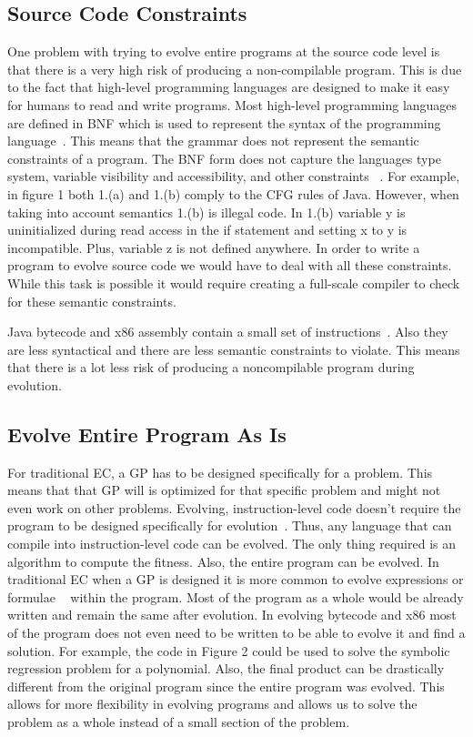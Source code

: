 \documentclass{sig-alternate}
\begin{document}
\subsection{Source Code Constraints}
One problem with trying to evolve entire programs at the source code level is that there is a very high risk of producing a non-compilable program. This is due to the fact that high-level programming languages are designed to make it easy for humans to read and write programs. Most high-level programming languages are defined in BNF which is used to represent the syntax of the programming language~\cite{Oracle:2013,Assembly:2010}. This means that the grammar does not represent the semantic constraints of a program. The BNF form does not capture the languages type system, variable visibility and accessibility, and other constraints ~\cite{FINCH:2011}. For example, in figure 1 both 1.(a) and 1.(b) comply to the CFG rules of Java. However, when taking into account semantics 1.(b) is illegal code. In 1.(b) variable y is uninitialized during read access in the if statement and setting x to y is incompatible. Plus, variable z is not defined anywhere.  In order to write a program to evolve source code we would have to deal with all these constraints. While this task is possible it would require creating a full-scale compiler to check for these semantic constraints. \par

Java bytecode and x86 assembly contain a small set of instructions~\cite{Assembly:2010}. Also they are less syntactical and there are less semantic constraints to violate. This means that there is a lot less risk of producing a noncompilable program during evolution. 

\subsection{Evolve Entire Program As Is}
For traditional EC, a GP has to be designed specifically for a problem. This means that that GP will is optimized for that specific problem and might not even work on other problems.  Evolving, instruction-level code doesn't require the program to be designed specifically for evolution~\cite{Assembly:2010,FINCH:2011}. Thus, any language that can compile into instruction-level code can be evolved. The only thing required is an algorithm to compute the fitness. Also, the entire program can be evolved. In traditional EC when a GP is designed it is more common to evolve expressions or formulae ~\cite{FINCH:2011} within the program. Most of the program as a whole would be already written and remain the same after evolution. In evolving bytecode and x86 most of the program does not even need to be written to be able to evolve it and find a solution. For example, the code in Figure 2 could be used to solve the symbolic regression problem for a polynomial. Also, the final product can be drastically different from the original program since the entire program was evolved. This allows for more flexibility in evolving programs and allows us to solve the problem as a whole instead of a small section of the problem.
\end{document}
